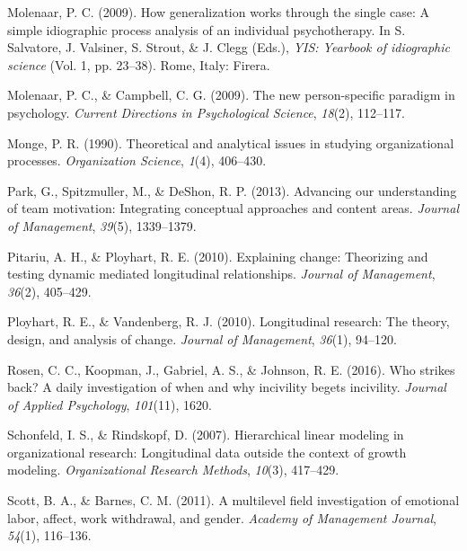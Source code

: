 \documentclass[english,,man]{apa6}
\theoremstyle{definition}
\theoremstyle{definition}
\theoremstyle{definition}
\theoremstyle{remark}
\begin{document}
\leavevmode\hypertarget{ref-molenaar2009generalization}{}%
Molenaar, P. C. (2009). How generalization works through the single
case: A simple idiographic process analysis of an individual
psychotherapy. In S. Salvatore, J. Valsiner, S. Strout, \& J. Clegg
(Eds.), \emph{YIS: Yearbook of idiographic science} (Vol. 1, pp.
23--38). Rome, Italy: Firera.

\leavevmode\hypertarget{ref-molenaar2009new}{}%
Molenaar, P. C., \& Campbell, C. G. (2009). The new person-specific
paradigm in psychology. \emph{Current Directions in Psychological
Science}, \emph{18}(2), 112--117.

\leavevmode\hypertarget{ref-monge_theoretical_1990}{}%
Monge, P. R. (1990). Theoretical and analytical issues in studying
organizational processes. \emph{Organization Science}, \emph{1}(4),
406--430.

\leavevmode\hypertarget{ref-park2013advancing}{}%
Park, G., Spitzmuller, M., \& DeShon, R. P. (2013). Advancing our
understanding of team motivation: Integrating conceptual approaches and
content areas. \emph{Journal of Management}, \emph{39}(5), 1339--1379.

\leavevmode\hypertarget{ref-pitariu_explaining_2010}{}%
Pitariu, A. H., \& Ployhart, R. E. (2010). Explaining change: Theorizing
and testing dynamic mediated longitudinal relationships. \emph{Journal
of Management}, \emph{36}(2), 405--429.

\leavevmode\hypertarget{ref-ployhart_longitudinal_2010}{}%
Ployhart, R. E., \& Vandenberg, R. J. (2010). Longitudinal research: The
theory, design, and analysis of change. \emph{Journal of Management},
\emph{36}(1), 94--120.

\leavevmode\hypertarget{ref-rosen_who_2016}{}%
Rosen, C. C., Koopman, J., Gabriel, A. S., \& Johnson, R. E. (2016). Who
strikes back? A daily investigation of when and why incivility begets
incivility. \emph{Journal of Applied Psychology}, \emph{101}(11), 1620.

\leavevmode\hypertarget{ref-schonfeld2007hierarchical}{}%
Schonfeld, I. S., \& Rindskopf, D. (2007). Hierarchical linear modeling
in organizational research: Longitudinal data outside the context of
growth modeling. \emph{Organizational Research Methods}, \emph{10}(3),
417--429.

\leavevmode\hypertarget{ref-scott_multilevel_2011}{}%
Scott, B. A., \& Barnes, C. M. (2011). A multilevel field investigation
of emotional labor, affect, work withdrawal, and gender. \emph{Academy
of Management Journal}, \emph{54}(1), 116--136.
\end{document}

